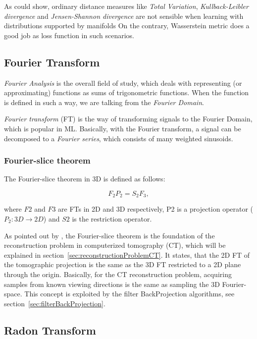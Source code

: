 As \citet{wassersteinGAN} could show, ordinary distance measures like \textit{Total Variation}, \textit{Kullback-Leibler divergence}
and \textit{Jensen-Shannon divergence} are not sensible when learning with distributions supported by manifolds
On the contrary, Wasserstein metric does a good job as loss function in such scenarios.


\subsection{Fourier Transform}
\textit{Fourier Analysis} is the overall field of study, which deals with representing (or approximating) functions as 
sums of trigonometric functions. When the function is defined in such a way, we are talking from the \textit{Fourier Domain}.

\textit{Fourier transform} (FT) is the way of transforming signals to the Fourier Domain, which is popular in ML.
Basically, with the Fourier transform, a signal can be decomposed to a \textit{Fourier series}, which consists of many weighted sinusoids. 


\subsubsection{Fourier-slice theorem}
The Fourier-slice theorem \cite{fourierSliceTheorem} in 3D is defined as follows:

\begin{equation}
    \label{eq:Fourrier-slice}
    F_2 P_2 = S_2 F_3,
\end{equation}

where $F2$ and $F3$ are FTs in 2D and 3D respectively, P2 is a projection operator ($P_2 : 3D \rightarrow 2D$) and $S2$ is the restriction operator.

As pointed out by \cite{cryoEmMath},
the Fourier-slice theorem is the foundation of the reconstruction problem in computerized tomography (CT), which will be explained in section~\ref{sec:reconstructionProblemCT}.
It states, that the 2D FT of the tomographic projection is the same as the 3D FT restricted to a 2D plane through the origin.
Basically, for the CT reconstruction problem, acquiring samples from known viewing directions is the same 
as sampling the 3D Fourier-space. This  concept is exploited by the filter BackProjection algorithms, see section~\ref{sec:filterBackProjection}.


\subsection{Radon Transform}


